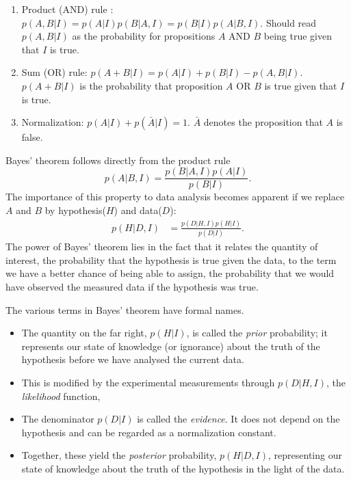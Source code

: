 \documentclass[%
oneside,                 %
final,                   %
10pt]{article}
\begin{document}
\begin{enumerate}
\item Product (AND) rule : $p(A, B | I) = p(A|I) p(B|A, I) = p(B|I)p(A|B,I)$. Should read $p(A,B|I)$ as the probability for propositions $A$ AND $B$ being true given that $I$ is true.

\item Sum (OR) rule: $p(A + B | I) = p(A | I) + p(B | I) - p(A, B | I)$. $p(A+B|I)$ is the probability that proposition $A$ OR $B$ is true given that $I$ is true.

\item Normalization: $p(A|I) + p(\bar{A}|I) = 1$. $\bar{A}$ denotes the proposition that $A$ is false.
\end{enumerate}

\noindent
Bayes' theorem follows directly from the product rule
$$
p(A|B,I) = \frac{p(B|A,I) p(A|I)}{p(B|I)}.
$$
The importance of this property to data analysis becomes apparent if we replace $A$ and $B$ by hypothesis($H$) and data($D$):
\begin{align}
p(H|D,I) &= \frac{p(D|H,I) p(H|I)}{p(D|I)}.
\label{eq:bayes}
\end{align}
The power of Bayes’ theorem lies in the fact that it relates the quantity of interest, the probability that the hypothesis is true given the data, to the term we have a better chance of being able to assign, the probability that we would have observed the measured data if the hypothesis was true.

The various terms in Bayes’ theorem have formal names. 
\begin{itemize}
\item The quantity on the far right, $p(H|I)$, is called the \emph{prior} probability; it represents our state of knowledge (or ignorance) about the truth of the hypothesis before we have analysed the current data. 

\item This is modified by the experimental measurements through $p(D|H,I)$, the \emph{likelihood} function, 

\item The denominator $p(D|I)$ is called the \emph{evidence}. It does not depend on the hypothesis and can be regarded as a normalization constant.

\item Together, these yield the \emph{posterior} probability, $p(H|D, I )$, representing our state of knowledge about the truth of the hypothesis in the light of the data. 
\end{itemize}

\noindent


\end{document}
